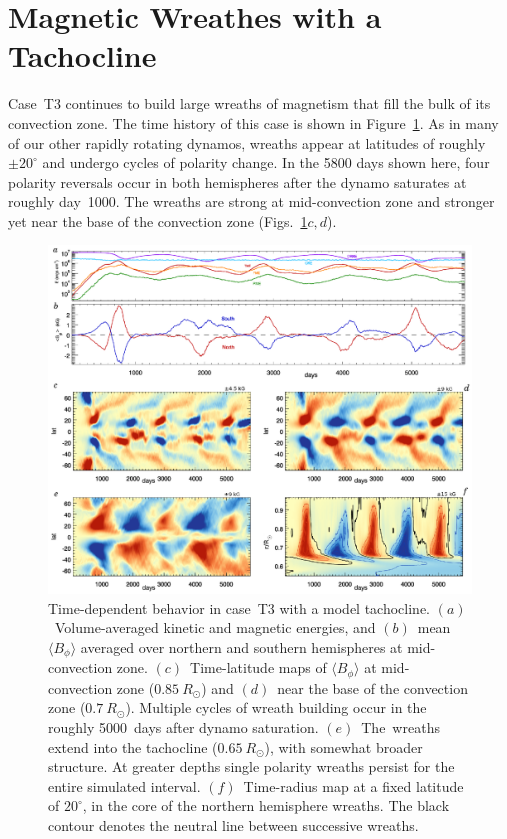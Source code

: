 \section{Magnetic Wreathes with a Tachocline}
\label{sec:tachocline}

Case~T3 continues to build large wreaths of magnetism that fill the
bulk of its convection zone.  The time history of this case is shown
in Figure~\ref{fig:T3}.  As in many of our other rapidly rotating
dynamos, wreaths appear at latitudes of roughly $\pm20^\circ$ and undergo cycles of
polarity change.  In the 5800 days shown here, four polarity reversals
occur in both hemispheres after the dynamo saturates at roughly
day~1000.  The wreaths are strong at mid-convection zone and stronger
yet near the base of the convection zone (Figs.~\ref{fig:T3}$c,d$).    
\begin{figure}
  \includegraphics{figs/chapter_9/mhd_tacho_3_time_history.eps}
  \caption[Time-dependent behavior in case~T3 with a model tachocline]
	  {Time-dependent behavior in case~T3 with a model tachocline.  
          $(a)$~Volume-averaged kinetic and magnetic energies, and
            $(b)$~mean $\langle B_\phi \rangle$ averaged over northern
            and southern hemispheres at mid-convection zone.  
            $(c)$~Time-latitude maps of $\langle B_\phi \rangle$ at
            mid-convection zone ($0.85\: R_\odot$) and $(d)$~near the
            base of the convection zone ($0.7\: R_\odot$).  Multiple
            cycles of wreath building occur in the roughly 5000~days
            after dynamo saturation.  $(e)$~The~wreaths extend into
            the tachocline ($0.65\: R_\odot$), with somewhat broader
            structure.  At greater depths single polarity wreaths
            persist for the entire simulated interval.  
            $(f)$~Time-radius map at a fixed latitude of $20^\circ$, in the
            core of the northern hemisphere wreaths.  The black
            contour denotes the neutral line between successive
            wreaths. 
          \label{fig:T3}}
\end{figure}
